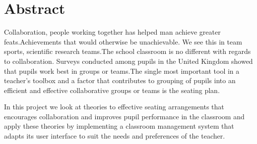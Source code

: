 \section*{Abstract}
Collaboration, people working together has helped man achieve greater feats.Achievements that would otherwise be unachievable. We see this in team sports, scientific research teams.The school classroom is no different with regards to collaboration. Surveys conducted among pupils in the United Kingdom showed that pupils work best in groups or teams.The single most important tool in a teacher's toolbox and a factor that contributes to grouping of pupils into an efficient and effective collaborative groups or teams is the seating plan. 

In this project we look at theories to effective seating arrangements that encourages collaboration and improves pupil performance in the classroom and apply these theories by implementing a classroom management system that adapts its user interface to suit the needs and preferences of the teacher.
